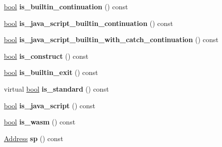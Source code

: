 \begin{DoxyCompactItemize}
\mbox{\hyperlink{classbool}{bool}} {\bfseries is\+\_\+builtin\+\_\+continuation} () const
\item 
\mbox{\label{classv8_1_1internal_1_1StackFrame_a1231f2dca783ef81d8093c252c598bb0}} 
\mbox{\hyperlink{classbool}{bool}} {\bfseries is\+\_\+java\+\_\+script\+\_\+builtin\+\_\+continuation} () const
\item 
\mbox{\label{classv8_1_1internal_1_1StackFrame_aa5f07c35d7aab5673f89f7a105d3d827}} 
\mbox{\hyperlink{classbool}{bool}} {\bfseries is\+\_\+java\+\_\+script\+\_\+builtin\+\_\+with\+\_\+catch\+\_\+continuation} () const
\item 
\mbox{\label{classv8_1_1internal_1_1StackFrame_a89b370f25c3761e289d9f0d2325c87d4}} 
\mbox{\hyperlink{classbool}{bool}} {\bfseries is\+\_\+construct} () const
\item 
\mbox{\label{classv8_1_1internal_1_1StackFrame_a22054792aec52a4cb16af7fcf2c522be}} 
\mbox{\hyperlink{classbool}{bool}} {\bfseries is\+\_\+builtin\+\_\+exit} () const
\item 
\mbox{\label{classv8_1_1internal_1_1StackFrame_a45c4a08416dec35182913ecd9c548b59}} 
virtual \mbox{\hyperlink{classbool}{bool}} {\bfseries is\+\_\+standard} () const
\item 
\mbox{\label{classv8_1_1internal_1_1StackFrame_ac2bcb35470bdbfe24f1f9d80791e8beb}} 
\mbox{\hyperlink{classbool}{bool}} {\bfseries is\+\_\+java\+\_\+script} () const
\item 
\mbox{\label{classv8_1_1internal_1_1StackFrame_aea7e9cc3a202c7e52ae6f5314e5af91e}} 
\mbox{\hyperlink{classbool}{bool}} {\bfseries is\+\_\+wasm} () const
\item 
\mbox{\label{classv8_1_1internal_1_1StackFrame_a62e284fd302dbca8c04aa744c28d4960}} 
\mbox{\hyperlink{classuintptr__t}{Address}} {\bfseries sp} () const
\item 
\mbox{\label{classv8_1_1internal_1_1StackFrame_acd57bdd7c8b254edf7f35b769e6db458}} 

\end{DoxyCompactItemize}
